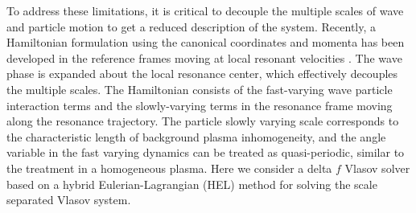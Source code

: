 \documentclass[times,12pt,3p,longtitle]{elsarticle}
\begin{document}
 To address these limitations, %
it is critical
 to decouple the multiple scales of wave and particle motion to get a reduced description of the system. 
Recently, a Hamiltonian formulation  using the canonical coordinates and momenta has been developed in the reference frames moving at local resonant velocities \cite{zheng2023a}.
The wave phase is expanded about the local resonance center, which effectively decouples  the multiple scales.
The Hamiltonian consists of 
the fast-varying wave particle interaction terms
and 
the slowly-varying terms in the resonance frame moving along the resonance trajectory. 
The particle slowly varying scale corresponds to the characteristic length of background plasma inhomogeneity, and the angle variable in the fast varying dynamics %
can be treated as quasi-periodic,
similar to the treatment in a homogeneous plasma.
Here we consider a delta $f$ Vlasov solver based on a hybrid Eulerian-Lagrangian (HEL) method  \cite{shiroto2022} for solving the scale separated Vlasov system.
\end{document}
